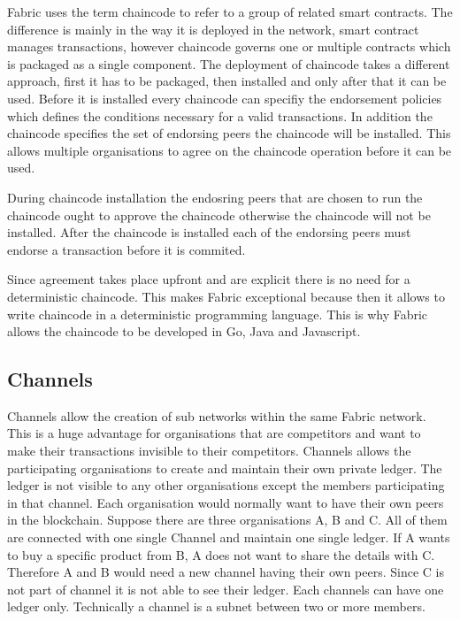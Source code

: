 Fabric uses the term chaincode to refer to a group of related smart contracts. The difference is mainly in the way it is deployed in the network, smart contract manages transactions, however chaincode governs one or multiple contracts which is packaged as a single component. The deployment of chaincode takes a different approach, first it has to be packaged, then installed and only after that it can be used. Before it is installed every chaincode can specifiy the endorsement policies which defines the conditions necessary for a valid transactions. In addition the chaincode specifies the set of  endorsing peers the chaincode will be installed. This allows multiple organisations to agree on the chaincode operation before it can be used. 


During chaincode installation the endosring peers that are chosen to run the chaincode ought to approve the chaincode otherwise the chaincode will not be installed. After the chaincode is installed each of the endorsing peers must endorse a transaction before it is commited. 



Since agreement takes place upfront and are explicit there is no need for a deterministic chaincode. This makes Fabric exceptional because then it allows to write chaincode in a deterministic programming language. This is why Fabric allows the chaincode to be developed in Go, Java and Javascript. 




\subsection{Channels}

Channels allow the creation of sub networks within the same Fabric network. This is a huge advantage for organisations that are competitors and want to make their transactions invisible to their competitors. Channels allows the participating organisations to create and maintain their own private ledger. The ledger is not visible to any other organisations except the members participating in that channel. 
Each organisation would normally want to have their own peers in the blockchain. Suppose there are three organisations A, B and C. All of them are connected with one single Channel and maintain one single ledger. If A wants to buy a specific product from B, A does not want to share the details with C. Therefore A and B would need a new channel having their own peers. Since C is not part of channel it is not able to see their ledger. Each channels can have one ledger only. 
Technically a channel is a subnet between two or more members.  

